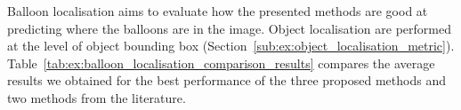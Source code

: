 

Balloon localisation aims to evaluate how the presented methods are good at predicting where the balloons are in the image.
Object localisation are performed at the level of object bounding box (Section~\ref{sub:ex:object_localisation_metric}).
Table~\ref{tab:ex:balloon_localisation_comparison_results} compares the average results we obtained for the best performance of the three proposed methods and two methods from the literature.


